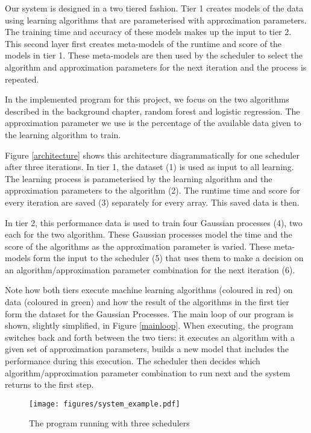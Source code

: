 \documentclass[a4paper,12pt,twoside,openright]{report}
\begin{document}

Our system is designed in a two tiered fashion. Tier 1 creates models of the data using learning algorithms that are parameterised with approximation parameters. The training time and accuracy of these models makes up the input to tier 2. This second layer first creates meta-models of the runtime and score of the models in tier 1. These meta-models are then used by the scheduler to select the algorithm and approximation parameters for the next iteration and the process is repeated.

In the implemented program for this project, we focus on the two algorithms described in the background chapter, random forest and logistic regression. The approximation parameter we use is the percentage of the available data given to the learning algorithm to train.

Figure \ref{architecture} shows this architecture diagrammatically for one scheduler after three iterations. In tier 1, the dataset (1) is used as input to all learning. The learning process is parameterised by the learning algorithm and the approximation parameters to the algorithm (2). The runtime time and score for every iteration are saved (3) separately for every array. This saved data is then. 

In tier 2, this performance data is used to train four Gaussian processes (4), two each for the two algorithm. These Gaussian processes model the time and the score of the algorithms as the approximation parameter is varied. These meta-models form the input to the scheduler (5) that uses them to make a decision on an algorithm/approximation parameter combination for the next iteration (6).


Note how both tiers execute machine learning algorithms (coloured in red) on data (coloured in green) and how the result of the algorithms in the first tier form the dataset for the Gaussian Processes. The main loop of our program is shown, slightly simplified, in Figure \ref{mainloop}. When executing, the program switches back and forth between the two tiers: it executes an algorithm with a given set of approximation parameters, builds a new model that includes the performance during this execution. The scheduler then decides which algorithm/approximation parameter combination to run next and the system returns to the first step.

\begin{figure}[p]
    \centerline{\texttt{[image: figures/system\_example.pdf]}}
  \caption{The program running with three schedulers}
    \label{systemexample}
\end{figure}
\end{document}

